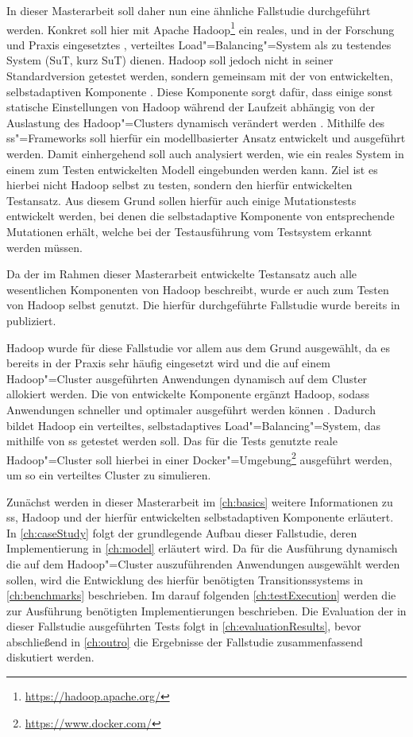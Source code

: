 In dieser Masterarbeit soll daher nun eine ähnliche Fallstudie durchgeführt werden.
Konkret soll hier mit Apache Hadoop\footnote{\url{https://hadoop.apache.org/}} ein reales, und in der Forschung und Praxis eingesetztes \cite{PoweredByHadoop}, verteiltes Load"=Balancing"=System als zu testendes System (\acrlong{SuT}, kurz \acrshort{SuT}) dienen.
Hadoop soll jedoch nicht in seiner Standardversion getestet werden, sondern gemeinsam mit der von \citeauthor{Zhang2016} entwickelten, selbstadaptiven Komponente \cite{Zhang2016}.
Diese Komponente sorgt dafür, dass einige sonst statische Einstellungen von Hadoop während der Laufzeit abhängig von der Auslastung des Hadoop"=Clusters dynamisch verändert werden \cite{Zhang2016}.
Mithilfe des \gls{ss}"=Frameworks soll hierfür ein modellbasierter Ansatz entwickelt und ausgeführt werden.
Damit einhergehend soll auch analysiert werden, wie ein reales System in einem zum Testen entwickelten Modell eingebunden werden kann.
Ziel ist es hierbei nicht Hadoop selbst zu testen, sondern den hierfür entwickelten Testansatz.
Aus diesem Grund sollen hierfür auch einige Mutationstests entwickelt werden, bei denen die selbstadaptive Komponente von \citeauthor{Zhang2016} entsprechende Mutationen erhält, welche bei der Testausführung vom Testsystem erkannt werden müssen.

Da der im Rahmen dieser Masterarbeit entwickelte Testansatz auch alle wesentlichen Komponenten von Hadoop beschreibt, wurde er auch zum Testen von Hadoop selbst genutzt.
Die hierfür durchgeführte Fallstudie wurde bereits in \cite{Eberhardinger2018} publiziert.

Hadoop wurde für diese Fallstudie vor allem aus dem Grund ausgewählt, da es bereits in der Praxis sehr häufig eingesetzt wird \cite{PoweredByHadoop} und die auf einem Hadoop"=Cluster ausgeführten Anwendungen dynamisch auf dem Cluster allokiert werden.
Die von \citeauthor{Zhang2016} entwickelte Komponente ergänzt Hadoop, sodass Anwendungen schneller und optimaler ausgeführt werden können \cite{Zhang2016}.
Dadurch bildet Hadoop ein verteiltes, selbstadaptives Load"=Balancing"=System, das mithilfe von \gls{ss} getestet werden soll.
Das für die Tests genutzte reale Hadoop"=Cluster soll hierbei in einer Docker"=Umgebung\footnote{\url{https://www.docker.com/}} ausgeführt werden, um so ein verteiltes Cluster zu simulieren.

Zunächst werden in dieser Masterarbeit im \cref{ch:basics} weitere Informationen zu \gls{ss}, Hadoop und der hierfür entwickelten selbstadaptiven Komponente erläutert.
In \cref{ch:caseStudy} folgt der grundlegende Aufbau dieser Fallstudie, deren Implementierung in \cref{ch:model} erläutert wird.
Da für die Ausführung dynamisch die auf dem Hadoop"=Cluster auszuführenden Anwendungen ausgewählt werden sollen, wird die Entwicklung des hierfür benötigten Transitionssystems in \cref{ch:benchmarks} beschrieben.
Im darauf folgenden \cref{ch:testExecution} werden die zur Ausführung benötigten Implementierungen beschrieben.
Die Evaluation der in dieser Fallstudie ausgeführten Tests folgt in \cref{ch:evaluationResults}, bevor abschließend in \cref{ch:outro} die Ergebnisse der Fallstudie zusammenfassend diskutiert werden.
